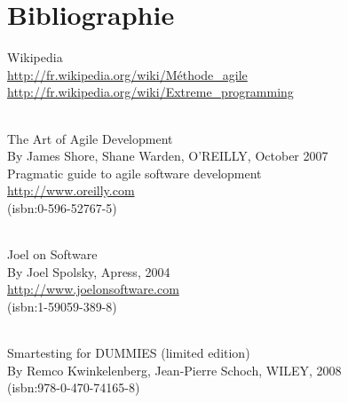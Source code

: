 \chapter{Bibliographie}

Wikipedia\\
\url{http://fr.wikipedia.org/wiki/Méthode_agile}\\
\url{http://fr.wikipedia.org/wiki/Extreme_programming}

\subparagraph*{}
The Art of Agile Development \\
By James Shore, Shane Warden, O'REILLY, October 2007\\
Pragmatic guide to agile software development\\
\url{http://www.oreilly.com}\\
(isbn:0-596-52767-5)

\subparagraph*{}
Joel on Software\\
By Joel Spolsky, Apress, 2004\\
\url{http://www.joelonsoftware.com}\\
(isbn:1-59059-389-8)

\subparagraph*{}
Smartesting for DUMMIES (limited edition)\\
By Remco Kwinkelenberg, Jean-Pierre Schoch, WILEY, 2008\\
(isbn:978-0-470-74165-8)
